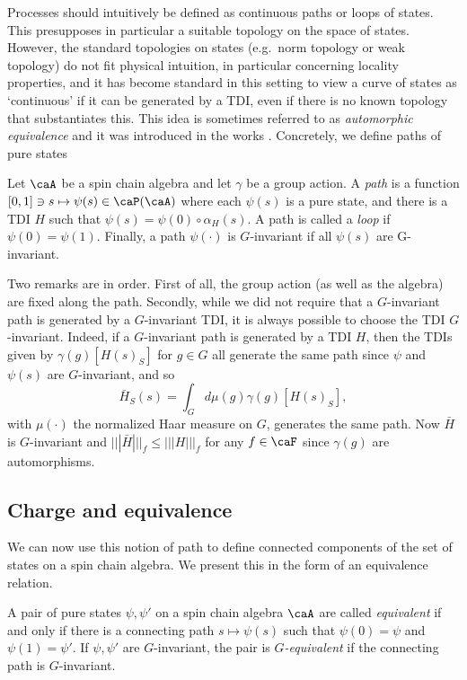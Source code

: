 Processes should intuitively be defined as continuous paths or loops of states.  This  presupposes in particular a suitable topology on the space of states. However, the standard topologies on states (e.g.\ norm topology or weak topology) do not fit physical intuition, in particular concerning locality properties, and it has become standard in this setting to view a curve of states as `continuous' if it can be generated by a TDI, even if there is no known topology that substantiates this.  This idea is sometimes referred to as \emph{automorphic equivalence} and it was introduced in the works \cite{hastings2005quasiadiabatic,bachmann2012automorphic}.  Concretely, we define paths of pure states
\begin{definition}[Paths] \label{def: paths}
	Let $\caA$ be a spin chain algebra and let $\gamma$ be a group action. A \emph{path} is a function $[0,1] \ni s \mapsto \psi(s)\in\caP(\caA)$ where each $\psi(s)$ is a pure state, and there is a TDI $H$ such that $\psi(s)=\psi(0)\circ\alpha_H(s)$. A path is called a \emph{loop} if $\psi(0) = \psi(1)$.
	Finally, a path $\psi(\cdot)$ is $G$-invariant if all $\psi(s)$ are G-invariant. 
\end{definition}
Two remarks are in order. First of all, the group action (as well as the algebra) are fixed along the path. Secondly, while we did not require that a $G$-invariant path is generated by a $G$-invariant TDI, it is always possible to choose the TDI $G$-invariant. Indeed, if a $G$-invariant path is generated by a TDI $H$, then the TDIs given by $\gamma(g)[H(s)_S]$ for $g\in G$ all generate the same path since $\psi$ and $\psi(s)$ are $G$-invariant, and so
$$
\bar{H}_S(s)=   \int_G d\mu(g)  \gamma(g)[H(s)_S],
$$
with $\mu(\cdot)$ the normalized Haar measure on $G$, generates the same path. Now $\bar{H}$ is $G$-invariant and $|||\bar H |||_f \leq |||H|||_f$ for any $f\in \caF$ since $\gamma(g)$ are automorphisms.


\subsection{Charge and equivalence}\label{sec: equivalence}

We can now use this notion of path to define connected components of the set of states on a spin chain algebra. We present this in the form of an equivalence relation.
\begin{definition}[Equivalence]
	A pair of pure states $\psi,\psi'$  on a spin chain algebra $\caA$ are called \emph{equivalent} if and only if there is a connecting  path $s\mapsto \psi(s)$ such that $\psi(0)=\psi$ and $\psi(1)=\psi'$. If $\psi,\psi'$ are $G$-invariant, the pair is \emph{$G$-equivalent} if the connecting path is $G$-invariant. 
\end{definition}

